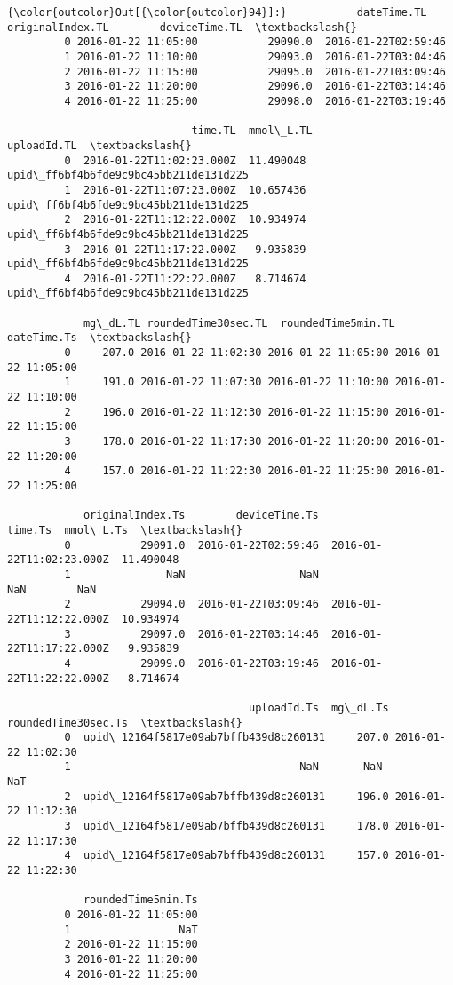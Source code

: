 \documentclass[11pt]{article}
\begin{document}
\begin{Verbatim}[commandchars=\\\{\}]
{\color{outcolor}Out[{\color{outcolor}94}]:}           dateTime.TL  originalIndex.TL        deviceTime.TL  \textbackslash{}
         0 2016-01-22 11:05:00           29090.0  2016-01-22T02:59:46   
         1 2016-01-22 11:10:00           29093.0  2016-01-22T03:04:46   
         2 2016-01-22 11:15:00           29095.0  2016-01-22T03:09:46   
         3 2016-01-22 11:20:00           29096.0  2016-01-22T03:14:46   
         4 2016-01-22 11:25:00           29098.0  2016-01-22T03:19:46   
         
                             time.TL  mmol\_L.TL                            uploadId.TL  \textbackslash{}
         0  2016-01-22T11:02:23.000Z  11.490048  upid\_ff6bf4b6fde9c9bc45bb211de131d225   
         1  2016-01-22T11:07:23.000Z  10.657436  upid\_ff6bf4b6fde9c9bc45bb211de131d225   
         2  2016-01-22T11:12:22.000Z  10.934974  upid\_ff6bf4b6fde9c9bc45bb211de131d225   
         3  2016-01-22T11:17:22.000Z   9.935839  upid\_ff6bf4b6fde9c9bc45bb211de131d225   
         4  2016-01-22T11:22:22.000Z   8.714674  upid\_ff6bf4b6fde9c9bc45bb211de131d225   
         
            mg\_dL.TL roundedTime30sec.TL  roundedTime5min.TL         dateTime.Ts  \textbackslash{}
         0     207.0 2016-01-22 11:02:30 2016-01-22 11:05:00 2016-01-22 11:05:00   
         1     191.0 2016-01-22 11:07:30 2016-01-22 11:10:00 2016-01-22 11:10:00   
         2     196.0 2016-01-22 11:12:30 2016-01-22 11:15:00 2016-01-22 11:15:00   
         3     178.0 2016-01-22 11:17:30 2016-01-22 11:20:00 2016-01-22 11:20:00   
         4     157.0 2016-01-22 11:22:30 2016-01-22 11:25:00 2016-01-22 11:25:00   
         
            originalIndex.Ts        deviceTime.Ts                   time.Ts  mmol\_L.Ts  \textbackslash{}
         0           29091.0  2016-01-22T02:59:46  2016-01-22T11:02:23.000Z  11.490048   
         1               NaN                  NaN                       NaN        NaN   
         2           29094.0  2016-01-22T03:09:46  2016-01-22T11:12:22.000Z  10.934974   
         3           29097.0  2016-01-22T03:14:46  2016-01-22T11:17:22.000Z   9.935839   
         4           29099.0  2016-01-22T03:19:46  2016-01-22T11:22:22.000Z   8.714674   
         
                                      uploadId.Ts  mg\_dL.Ts roundedTime30sec.Ts  \textbackslash{}
         0  upid\_12164f5817e09ab7bffb439d8c260131     207.0 2016-01-22 11:02:30   
         1                                    NaN       NaN                 NaT   
         2  upid\_12164f5817e09ab7bffb439d8c260131     196.0 2016-01-22 11:12:30   
         3  upid\_12164f5817e09ab7bffb439d8c260131     178.0 2016-01-22 11:17:30   
         4  upid\_12164f5817e09ab7bffb439d8c260131     157.0 2016-01-22 11:22:30   
         
            roundedTime5min.Ts  
         0 2016-01-22 11:05:00  
         1                 NaT  
         2 2016-01-22 11:15:00  
         3 2016-01-22 11:20:00  
         4 2016-01-22 11:25:00  
\end{Verbatim}
            
\end{document}

